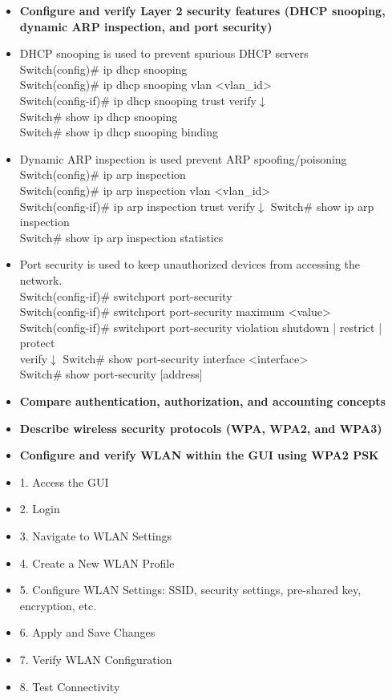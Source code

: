 \documentclass{article}
\begin{document}
\begin{itemize}
  \item \textbf{Configure and verify Layer 2 security features (DHCP snooping, dynamic ARP inspection, and port security)}
  	\item[] DHCP snooping is used to prevent spurious DHCP servers\\
  		Switch(config)\# ip dhcp snooping\\
		Switch(config)\# ip dhcp snooping vlan \textless vlan\_id\textgreater\\
		Switch(config-if)\# ip dhcp snooping trust
		verify$\downarrow$\\
		Switch\# show ip dhcp snooping\\
		Switch\# show ip dhcp snooping binding
  	\item[] Dynamic ARP inspection is used prevent ARP spoofing/poisoning\\
  		Switch(config)\# ip arp inspection\\
		Switch(config)\# ip arp inspection vlan \textless vlan\_id\textgreater\\
		Switch(config-if)\# ip arp inspection trust
		verify$\downarrow$
		Switch\# show ip arp inspection\\
		Switch\# show ip arp inspection statistics
  	\item[] Port security is used to keep unauthorized devices from accessing the network.\\
  		Switch(config-if)\# switchport port-security\\
		Switch(config-if)\# switchport port-security maximum \textless value\textgreater\\
		Switch(config-if)\# switchport port-security violation {shutdown | restrict | protect}\\
		verify$\downarrow$
		Switch\# show port-security interface \textless interface\textgreater\\
		Switch\# show port-security [address]
  
  \item \textbf{Compare authentication, authorization, and accounting concepts}
  
  \item \textbf{Describe wireless security protocols (WPA, WPA2, and WPA3)}
  
  \item \textbf{Configure and verify WLAN within the GUI using WPA2 PSK}
	\item[] 1. Access the GUI
	\item[] 2. Login
	\item[] 3. Navigate to WLAN Settings
	\item[] 4. Create a New WLAN Profile
	\item[] 5. Configure WLAN Settings: SSID, security settings, pre-shared key, encryption, etc.
	\item[] 6. Apply and Save Changes
	\item[] 7. Verify WLAN Configuration
	\item[] 8. Test Connectivity

\end{itemize}
\end{document}
